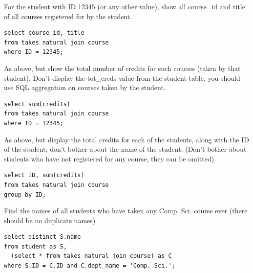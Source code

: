 \documentclass[logo,reportComp]{thesis}
\begin{document}
\begin{question}
\normalfont 
For the student with ID 12345 (or any other value), show all course\_id and title of all courses registered for by the student.
\end{question}
\begin{answer}\mbox{}\par
\begin{lstlisting}
select course_id, title
from takes natural join course
where ID = 12345;
\end{lstlisting}
\end{answer}

\begin{question}
\normalfont 
As above, but show the total number of credits for such courses (taken by that student). Don't display the tot\_creds value from the student table, you should use SQL aggregation on courses taken by the student.
\end{question}
\begin{answer}\mbox{}\par
\begin{lstlisting}
select sum(credits)
from takes natural join course
where ID = 12345;
\end{lstlisting}
\end{answer}

\begin{question}
\normalfont 
As above, but display the total credits for each of the students, along with the ID of the student; don't bother about the name of the student. (Don't bother about students who have not registered for any course, they can be omitted)
\end{question}
\begin{answer}\mbox{}\par
\begin{lstlisting}
select ID, sum(credits)
from takes natural join course
group by ID;
\end{lstlisting}
\end{answer}

\begin{question}
\normalfont 
Find the names of all students who have taken any Comp. Sci. course ever (there should be no duplicate names)
\end{question}
\begin{answer}\mbox{}\par
\begin{lstlisting}
select distinct S.name
from student as S, 
  (select * from takes natural join course) as C
where S.ID = C.ID and C.dept_name = 'Comp. Sci.';
\end{lstlisting}
\end{answer}
\end{document}
